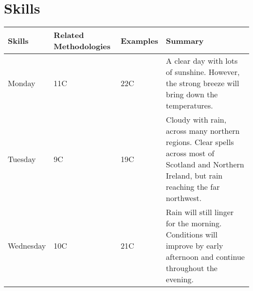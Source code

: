 
\chapter{Skills} %

\label{Chapter6}

\begin{center}
	\begin{tabular}{ | l | l | l | p{5cm} |}
		\hline
		Skills & Related Methodologies & Examples & Summary \\ \hline
		Monday & 11C & 22C & A clear day with lots of sunshine.
		However, the strong breeze will bring down the temperatures. \\ \hline
		Tuesday & 9C & 19C & Cloudy with rain, across many northern regions. Clear spells
		across most of Scotland and Northern Ireland,
		but rain reaching the far northwest. \\ \hline
		Wednesday & 10C & 21C & Rain will still linger for the morning.
		Conditions will improve by early afternoon and continue
		throughout the evening. \\
		\hline
	\end{tabular}
\end{center}


